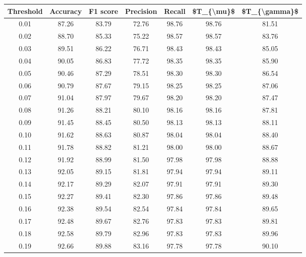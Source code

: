 \begin{tabular}{|c|c|c|c|c|c|c|}
\hline
 Threshold &  Accuracy &  F1 score &  Precision &  Recall &  \$T\_\{\textbackslash mu\}\$ &  \$T\_\{\textbackslash gamma\}\$ \\
\hline
      0.01 &     87.26 &     83.79 &      72.76 &   98.76 &      98.76 &         81.51 \\
      0.02 &     88.70 &     85.33 &      75.22 &   98.57 &      98.57 &         83.76 \\
      0.03 &     89.51 &     86.22 &      76.71 &   98.43 &      98.43 &         85.05 \\
      0.04 &     90.05 &     86.83 &      77.72 &   98.35 &      98.35 &         85.90 \\
      0.05 &     90.46 &     87.29 &      78.51 &   98.30 &      98.30 &         86.54 \\
      0.06 &     90.79 &     87.67 &      79.15 &   98.25 &      98.25 &         87.06 \\
      0.07 &     91.04 &     87.97 &      79.67 &   98.20 &      98.20 &         87.47 \\
      0.08 &     91.26 &     88.21 &      80.10 &   98.16 &      98.16 &         87.81 \\
      0.09 &     91.45 &     88.45 &      80.50 &   98.13 &      98.13 &         88.11 \\
      0.10 &     91.62 &     88.63 &      80.87 &   98.04 &      98.04 &         88.40 \\
      0.11 &     91.78 &     88.82 &      81.21 &   98.00 &      98.00 &         88.67 \\
      0.12 &     91.92 &     88.99 &      81.50 &   97.98 &      97.98 &         88.88 \\
      0.13 &     92.05 &     89.15 &      81.81 &   97.94 &      97.94 &         89.11 \\
      0.14 &     92.17 &     89.29 &      82.07 &   97.91 &      97.91 &         89.30 \\
      0.15 &     92.27 &     89.41 &      82.30 &   97.86 &      97.86 &         89.48 \\
      0.16 &     92.38 &     89.54 &      82.54 &   97.84 &      97.84 &         89.65 \\
      0.17 &     92.48 &     89.67 &      82.76 &   97.83 &      97.83 &         89.81 \\
      0.18 &     92.58 &     89.79 &      82.96 &   97.83 &      97.83 &         89.96 \\
      0.19 &     92.66 &     89.88 &      83.16 &   97.78 &      97.78 &         90.10 \\

\end{tabular}
